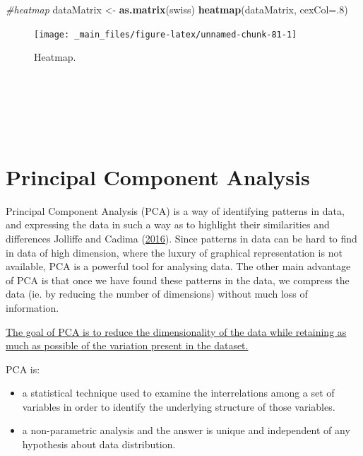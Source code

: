 \documentclass[
]{svmono}
\newenvironment{Shaded}{\begin{snugshade}}{\end{snugshade}}
\newcommand{\AttributeTok}[1]{\textcolor[rgb]{0.13,0.29,0.53}{#1}}
\newcommand{\CommentTok}[1]{\textcolor[rgb]{0.56,0.35,0.01}{\textit{#1}}}
\newcommand{\DecValTok}[1]{\textcolor[rgb]{0.00,0.00,0.81}{#1}}
\newcommand{\FunctionTok}[1]{\textcolor[rgb]{0.13,0.29,0.53}{\textbf{#1}}}
\newcommand{\NormalTok}[1]{#1}
\newcommand{\OtherTok}[1]{\textcolor[rgb]{0.56,0.35,0.01}{#1}}
\providecommand{\tightlist}{%
  \setlength{\itemsep}{0pt}\setlength{\parskip}{0pt}}
\begin{document}
\begin{Shaded}
\begin{Highlighting}[]
\CommentTok{\#heatmap}
\NormalTok{dataMatrix }\OtherTok{\textless{}{-}} \FunctionTok{as.matrix}\NormalTok{(swiss)}
\FunctionTok{heatmap}\NormalTok{(dataMatrix, }\AttributeTok{cexCol=}\NormalTok{.}\DecValTok{8}\NormalTok{)}
\end{Highlighting}
\end{Shaded}

\begin{figure}[H]

{\centering \texttt{[image: \_main\_files/figure-latex/unnamed-chunk-81-1]} 

}

\caption{Heatmap.}\label{fig:unnamed-chunk-81}
\end{figure}

~

~

~

\hypertarget{principal-component-analysis}{%
\section{Principal Component Analysis}\label{principal-component-analysis}}

Principal Component Analysis (PCA) is a way of identifying patterns in
data, and expressing the data in such a way as to highlight their
similarities and differences Jolliffe and Cadima (\protect\hyperlink{ref-jolliffe2016}{2016}). Since patterns
in data can be hard to find in data of high dimension, where the luxury
of graphical representation is not available, PCA is a powerful tool for
analysing data. The other main advantage of PCA is that once we have
found these patterns in the data, we compress the data (ie. by reducing
the number of dimensions) without much loss of information.

\ul{The goal of PCA is to reduce the dimensionality of the data while
retaining as much as possible of the variation present in the
dataset.}

PCA is:

\begin{itemize}
\tightlist
\item
  a statistical technique used to examine the interrelations among a
  set of variables in order to identify the underlying structure of
  those variables.
\item
  a non-parametric analysis and the answer is unique and independent
  of any hypothesis about data distribution.
\end{itemize}
\end{document}
